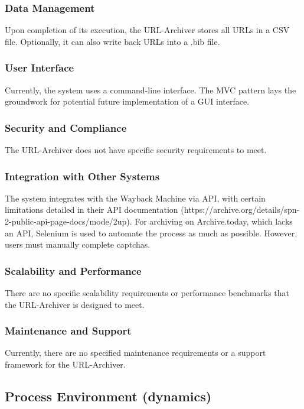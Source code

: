 \subsubsection{Data Management}
Upon completion of its execution, the URL-Archiver stores all URLs in a CSV file. Optionally, it can also write back URLs into a .bib file.

\subsubsection{User Interface}
Currently, the system uses a command-line interface. The MVC pattern lays the groundwork for potential future implementation of a GUI interface.

\subsubsection{Security and Compliance}
The URL-Archiver does not have specific security requirements to meet.

\subsubsection{Integration with Other Systems}
The system integrates with the Wayback Machine via API, with certain limitations detailed in their API documentation (https://archive.org/details/spn-2-public-api-page-docs/mode/2up). For archiving on Archive.today, which lacks an API, Selenium is used to automate the process as much as possible. However, users must manually complete captchas.

\subsubsection{Scalability and Performance}
There are no specific scalability requirements or performance benchmarks that the URL-Archiver is designed to meet.

\subsubsection{Maintenance and Support}
Currently, there are no specified maintenance requirements or a support framework for the URL-Archiver.


\subsection{Process Environment (dynamics)}


